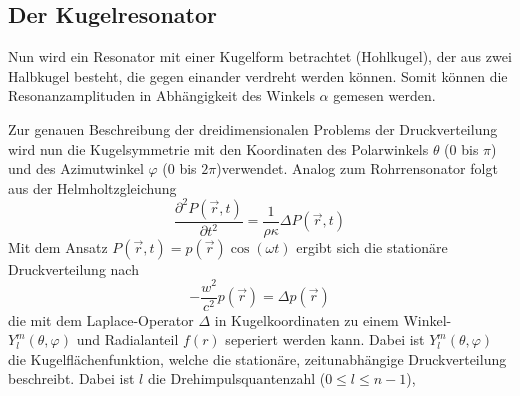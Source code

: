 \subsection{Der Kugelresonator}
Nun wird ein Resonator mit einer Kugelform betrachtet (Hohlkugel), der aus zwei Halbkugel besteht, die gegen einander verdreht werden können.
Somit können die Resonanzamplituden in Abhängigkeit des Winkels $\alpha$ gemesen werden.

Zur genauen Beschreibung der dreidimensionalen Problems der Druckverteilung wird nun die Kugelsymmetrie mit den Koordinaten des Polarwinkels $\theta$ (0 bis $\pi$)
und des Azimutwinkel $\varphi$ (0 bis $2\pi$)verwendet.
Analog zum Rohrrensonator folgt aus der Helmholtzgleichung
\begin{equation}
    \frac{\partial^2 P(\vec{r}{,}t)}{\partial t^2}=\frac{1}{\rho\kappa}\Delta P(\vec{r}{,}t)
\end{equation}
Mit dem Ansatz $P(\vec{r}{,}t)=p(\vec{r})\cos{(\omega t)}$ ergibt sich die stationäre 
Druckverteilung nach
\begin{equation}
    -\frac{w^2}{c^2}p(\vec{r})=\Delta p(\vec{r})
\end{equation}
die mit dem Laplace-Operator $\Delta$ in Kugelkoordinaten zu einem Winkel- $Y_l^m(\theta{,}\varphi)$ und 
Radialanteil $f(r)$ seperiert werden kann. Dabei ist $Y_l^m(\theta{,}\varphi)$ die Kugelflächenfunktion, welche die 
stationäre, zeitunabhängige Druckverteilung beschreibt. Dabei ist $l$ die Drehimpulsquantenzahl ($0\leq l \leq n-1$),



